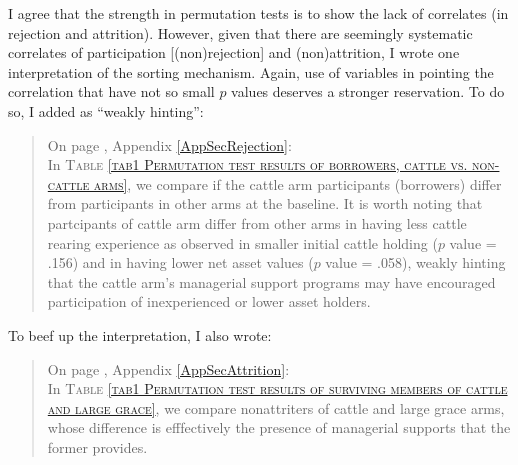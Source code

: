 \begin{enumerate}
\hspace{1em} I agree that the strength in permutation tests is to show the lack of correlates (in rejection and attrition). However, given that there are seemingly systematic correlates of participation [(non)rejection] and (non)attrition, I wrote one interpretation of the sorting mechanism. Again, use of variables in pointing the correlation that have not so small $p$ values deserves a stronger reservation. To do so, I added as ``weakly hinting'':
\begin{quotation}
On page \pageref{RejectionLastPage}, Appendix \ref{AppSecRejection}:\\
	In \textsc{\normalsize Table \ref{tab1 Permutation test results of borrowers, cattle vs. non-cattle arms}}, we compare if the \textsf{cattle} arm participants (borrowers) differ from participants in other arms at the baseline. It is worth noting that partcipants of \textsf{cattle} arm differ from other arms in having less cattle rearing experience as observed in smaller initial cattle holding ($p$ value = .156) and in having lower net asset values ($p$ value = .058), weakly hinting that the \textsf{cattle} arm's managerial support programs may have encouraged participation of inexperienced or lower asset holders.
\end{quotation}
To beef up the interpretation, I also wrote:
\begin{quotation}
On page \pageref{PageOfAttrition}, Appendix \ref{AppSecAttrition}:\\
In \textsc{\normalsize Table \ref{tab1 Permutation test results of surviving members of cattle and large grace}}, we compare nonattriters of \textsf{cattle} and \textsf{large grace} arms, whose difference is efffectively the presence of managerial supports that the former provides. \label{PageOfAttrition}%

\end{quotation}
\end{enumerate}

